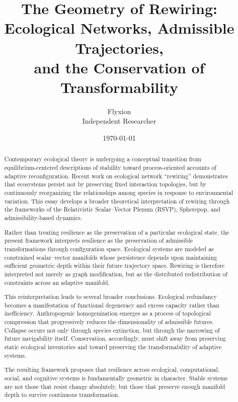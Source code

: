\documentclass[11pt,a4paper]{article}
\title{
\Large \textbf{
The Geometry of Rewiring:\\
Ecological Networks, Admissible Trajectories,\\
and the Conservation of Transformability
}
}
\author{
Flyxion\\
Independent Researcher
}
\date{\today}
\begin{document}
\maketitle

\begin{abstract}

Contemporary ecological theory is undergoing a conceptual transition from equilibrium-centered descriptions of stability toward process-oriented accounts of adaptive reconfiguration. Recent work on ecological network ``rewiring'' demonstrates that ecosystems persist not by preserving fixed interaction topologies, but by continuously reorganizing the relationships among species in response to environmental variation. This essay develops a broader theoretical interpretation of rewiring through the frameworks of the Relativistic Scalar--Vector Plenum (RSVP), Spherepop, and admissibility-based dynamics.

Rather than treating resilience as the preservation of a particular ecological state, the present framework interprets resilience as the preservation of admissible transformations through configuration space. Ecological systems are modeled as constrained scalar--vector manifolds whose persistence depends upon maintaining sufficient geometric depth within their future trajectory space. Rewiring is therefore interpreted not merely as graph modification, but as the distributed redistribution of constraints across an adaptive manifold.

This reinterpretation leads to several broader conclusions. Ecological redundancy becomes a manifestation of functional degeneracy and excess capacity rather than inefficiency. Anthropogenic homogenization emerges as a process of topological compression that progressively reduces the dimensionality of admissible futures. Collapse occurs not only through species extinction, but through the narrowing of future navigability itself. Conservation, accordingly, must shift away from preserving static ecological inventories and toward preserving the transformability of adaptive systems.

The resulting framework proposes that resilience across ecological, computational, social, and cognitive systems is fundamentally geometric in character. Stable systems are not those that resist change absolutely, but those that preserve enough manifold depth to survive continuous transformation.

\end{abstract}

\tableofcontents
\end{document}
